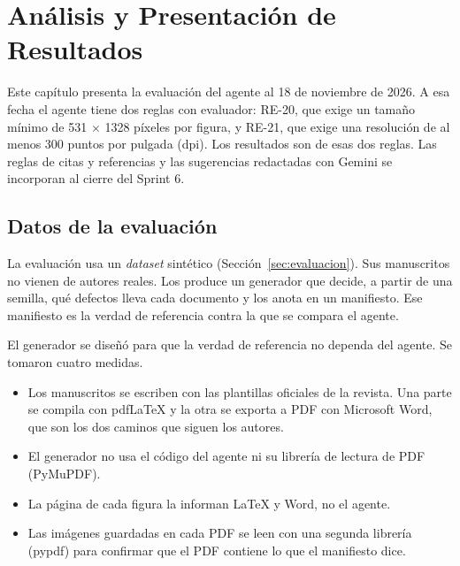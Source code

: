 
\chapter{Análisis y Presentación de Resultados}\label{cap:resultados}

Este capítulo presenta la evaluación del agente al 18 de noviembre de 2026. A esa fecha el agente tiene dos reglas con evaluador: RE-20, que exige un tamaño mínimo de 531 $\times$ 1328 píxeles por figura, y RE-21, que exige una resolución de al menos 300 puntos por pulgada (dpi). Los resultados son de esas dos reglas. Las reglas de citas y referencias y las sugerencias redactadas con Gemini se incorporan al cierre del Sprint 6.

\section{Datos de la evaluación}\label{sec:dataset}

La evaluación usa un \emph{dataset} sintético (Sección~\ref{sec:evaluacion}). Sus manuscritos no vienen de autores reales. Los produce un generador que decide, a partir de una semilla, qué defectos lleva cada documento y los anota en un manifiesto. Ese manifiesto es la verdad de referencia contra la que se compara el agente.

El generador se diseñó para que la verdad de referencia no dependa del agente. Se tomaron cuatro medidas.

\begin{itemize}
  \item Los manuscritos se escriben con las plantillas oficiales de la revista. Una parte se compila con pdfLaTeX y la otra se exporta a PDF con Microsoft Word, que son los dos caminos que siguen los autores.
  \item El generador no usa el código del agente ni su librería de lectura de PDF (PyMuPDF).
  \item La página de cada figura la informan LaTeX y Word, no el agente.
  \item Las imágenes guardadas en cada PDF se leen con una segunda librería (pypdf) para confirmar que el PDF contiene lo que el manifiesto dice.
\end{itemize}

